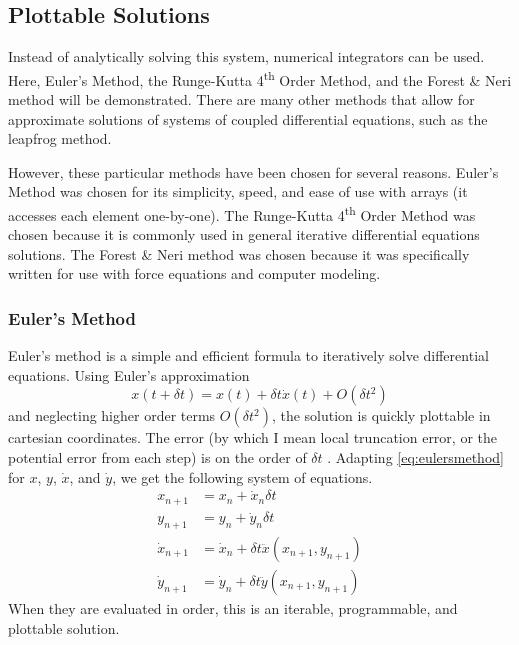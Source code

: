 \documentclass[preprint,titlepage,preprintnumbers,amsmath,amssymb,aps,11pt]{revtex4-2}
\begin{document}
\subsection{Plottable Solutions}
Instead of analytically solving this system, numerical integrators can be used. Here, Euler's Method, the Runge-Kutta 4\textsuperscript{th} Order Method, and the Forest \& Neri method will be demonstrated. There are many other methods that allow for approximate solutions of systems of coupled differential equations, such as the leapfrog method.

However, these particular methods have been chosen for several reasons. Euler's Method was chosen for its simplicity, speed, and ease of use with arrays (it accesses each element one-by-one). The Runge-Kutta 4\textsuperscript{th} Order Method was chosen because it is commonly used in general iterative differential equations solutions. The Forest \& Neri method was chosen because it was specifically written for use with force equations and computer modeling.

\subsubsection{Euler's Method}\label{sec:euler}
Euler's method is a simple and efficient formula to iteratively solve differential equations. Using Euler's approximation
\begin{equation}
    x(t+\delta t)=x(t)+\delta t\dot{x}(t)+O(\delta t^2)
    \label{eq:eulersmethod}
\end{equation}
and neglecting higher order terms $O(\delta t^2)$, the solution is quickly plottable in cartesian coordinates. The error (by which I mean local truncation error, or the potential error from each step) is on the order of $\delta t$ \cite[p. 298]{Wild1980}.
Adapting \ref{eq:eulersmethod} for $x$, $y$, $\dot{x}$, and $\dot{y}$, we get the following system of equations.
\begin{equation}
    \begin{aligned}
        x_{n+1}       & =x_n+\dot{x}_n\delta t                       \\
        y_{n+1}       & =y_n+\dot{y}_n\delta t                       \\
        \dot{x}_{n+1} & =\dot{x}_n+\delta t\ddot{x}(x_{n+1},y_{n+1}) \\
        \dot{y}_{n+1} & =\dot{y}_n+\delta t\ddot{y}(x_{n+1},y_{n+1})
    \end{aligned}
\end{equation}
When they are evaluated in order, this is an iterable, programmable, and plottable solution.
\end{document}
